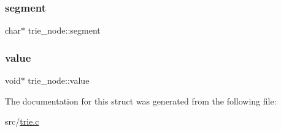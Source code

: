 \mbox{\label{structtrie__node_a12084a8e8f390a22ed508767066eba93}} 
\subsubsection{\texorpdfstring{segment}{segment}}
{\footnotesize\ttfamily char$\ast$ trie\+\_\+node\+::segment}

\mbox{\label{structtrie__node_a7915ff25676c2c37fe54a7b3055cca6a}} 
\subsubsection{\texorpdfstring{value}{value}}
{\footnotesize\ttfamily void$\ast$ trie\+\_\+node\+::value}



The documentation for this struct was generated from the following file\+:\begin{DoxyCompactItemize}
\item 
src/\mbox{\hyperlink{trie_8c}{trie.\+c}}\end{DoxyCompactItemize}

